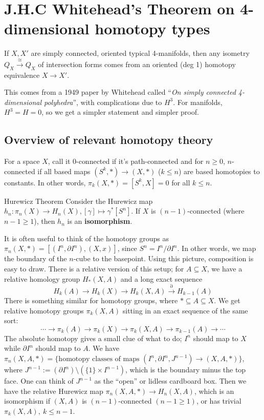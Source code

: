 \section{J.H.C Whitehead's Theorem on 4-dimensional homotopy types} 
\begin{theorem}
    If $X,X'$ are simply connected, oriented typical 4-manifolds, then any isometry $Q_X \xrightarrow{\cong} Q_X$ of intersection forms comes from an oriented (deg 1) homotopy equivalence $X \to X'$.
\end{theorem}
This comes from a 1949 paper by Whitehead called ``\emph{On simply connected 4-dimensional polyhedra}'', with complications due to $H^3$. For manifolds, $H^3=H=0$, so we get a simpler statement and simpler proof.

\subsection{Overview of relevant homotopy theory}
For a space $X$, call it 0-connected if it's path-connected and for $n\geq 0$, $n$-connected if all based maps $(S^k,*) \to (X,*)$ ($k \leq n$) are based homotopies to constants. In other words, $\pi_k(X,*)=[S^k, X] = 0$ for all $k \leq n$.
\begin{namedthm}{Hurewicz Theorem} 
    Consider the Hurewicz map $h_n  \colon \pi_n (X) \to H_n (X), [\gamma ] \mapsto  \gamma ^*[S^n ]$. If $X $ is $(n-1)$-connected (where $n-1 \geq 1$), then $h_n $ is an \textbf{isomorphism}.
\end{namedthm}
It is often useful to think of the homotopy groups as $\pi_n (X,*) = [(I^n , \partial I^n ),(X,x)]$, since $S^n  = I^n  /\partial I^n $. In other words, we map the boundary of the $n$-cube to the basepoint. Using this picture, composition is easy to draw. There is a relative version of this setup; for $A \subseteq X$, we have a relative homology group $H_*(X,A)$ and a long exact sequence \[
    H_k(A) \to H_k(X) \to H_k(X,A) \xrightarrow{\partial }  H_{k-1}(A)
\] There is something similar for homotopy groups, where $* \subseteq A \subseteq X$. We get relative homotopy groups $\pi_k(X,A)$ sitting in an exact sequence of the same sort: \[
\cdots \to \pi_k(A) \to \pi_k(X) \to \pi_k(X,A) \to \pi_{k-1}(A) \to \cdots 
\] The absolute homotopy gives a small clue of what to do; $I^n $ should map to $X$ while $\partial I^n $ should map to $A$. We have $\pi_n (X,A,*) = \{\text{homotopy classes of maps } (I^n ,\partial I^n ,J^{n-1} ) \to (X,A,*)\} $, where $J^{n-1}:= (\partial I^n ) \setminus \left( \{1\} \times I^{n-1}   \right) $, which is the boundary minus the top face. One can think of $J^{n-1}$ as the ``open'' or lidless cardboard box. Then we have the relative Hurewicz map $\pi_n (X,A,*) \to H_n (X,A)$, which is an isomorphism if $(X,A) $ is $(n-1)$-connected $(n-1 \geq 1)$, or has trivial $\pi_k(X,A) ,\ k \leq n-1$.

